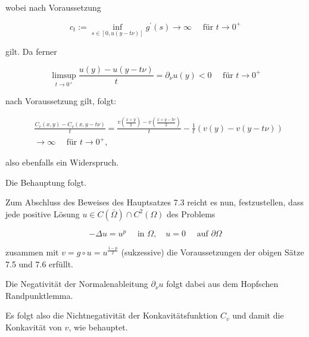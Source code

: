 \documentclass[10pt, letterpaper]{article}
\begin{document}
wobei nach Voraussetzung

$$
c_{t}:=\inf _{s \in[0, u(y-t \nu)]} g^{\prime}(s) \rightarrow \infty \quad \text { für } t \rightarrow 0^{+}
$$

gilt. Da ferner

$$
\limsup _{t \rightarrow 0^{+}} \frac{u(y)-u(y-t \nu)}{t}=\partial_{\nu} u(y)<0 \quad \text { für } t \rightarrow 0^{+}
$$

nach Voraussetzung gilt, folgt:

$$
\begin{aligned}
& \frac{C_{v}(x, y)-C_{v}(x, y-t \nu)}{t}=\frac{v\left(\frac{x+y}{2}\right)-v\left(\frac{x+y-t \nu}{2}\right)}{t}-\frac{1}{t}(v(y)-v(y-t \nu)) \\
& \rightarrow \infty \quad \text { für } t \rightarrow 0^{+},
\end{aligned}
$$

also ebenfalls ein Widerspruch.

Die Behauptung folgt.

Zum Abschluss des Beweises des Hauptsatzes 7.3 reicht es nun, festzustellen, dass jede positive Lösung $u \in C(\bar{\Omega}) \cap C^{2}(\Omega)$ des Problems

$$
-\Delta u=u^{p} \quad \text { in } \Omega, \quad u=0 \quad \text { auf } \partial \Omega
$$

zusammen mit $v=g \circ u=u^{\frac{1-p}{2}}$ (sukzessive) die Voraussetzungen der obigen Sätze 7.5 und 7.6 erfüllt.

Die Negativität der Normalenableitung $\partial_{\nu} u$ folgt dabei aus dem Hopfschen Randpunktlemma.

Es folgt also die Nichtnegativität der Konkavitätsfunktion $C_{v}$ und damit die Konkavität von $v$, wie behauptet.







\pagebreak
\printbibliography
\end{document}

